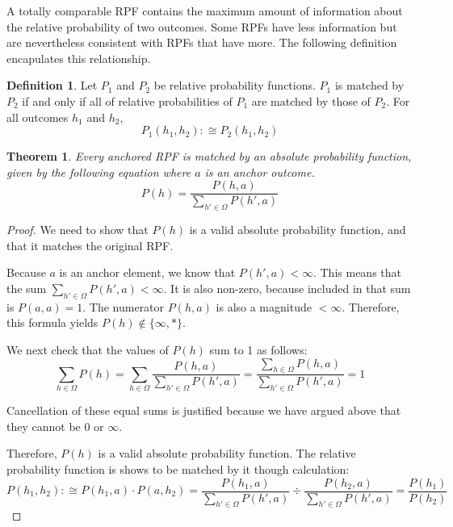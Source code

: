 \documentclass[twoside]{article}
\theoremstyle{plain}%
\newtheorem{theorem}{Theorem}[section]
\theoremstyle{definition}
\newtheorem{definition}{Definition}[section]
\theoremstyle{remark}
\begin{document}
A totally comparable RPF contains the maximum amount of information about the relative probability of two outcomes. Some RPFs have less information but are nevertheless consistent with RPFs that have more. The following definition encapulates this relationship.

\begin{definition}
Let \(P_1\) and \(P_2\) be relative probability functions. \(P_1\) is matched by \(P_2\) if and only if all of relative probabilities of \(P_1\) are matched by those of \(P_2\). For all outcomes \(h_1\) and \(h_2\),
\[P_1(h_1, h_2) :\cong P_2(h_1, h_2)\]
\end{definition}

\begin{theorem}
\label{thm:absolute_prob_formula}
Every anchored RPF is matched by an absolute probability function, given by the following equation where \(a\) is an anchor outcome.
\[P(h) = \frac{P(h, a)}{\sum_{h' \in \Omega}P(h', a)}\]
\end{theorem}

\begin{proof}
We need to show that \(P(h)\) is a valid absolute probability function, and that it matches the original RPF.

Because \(a\) is an anchor element, we know that \(P(h', a) < \infty\). This means that the sum \(\sum_{h' \in \Omega}P(h', a) < \infty\). It is also non-zero, because included in that sum is \(P(a, a) = 1\). The numerator \(P(h, a)\) is also a magnitude \(< \infty\). Therefore, this formula yields \(P(h) \notin \{\infty, \ast\}\).

We next check that the values of \(P(h)\) sum to 1 as follows:
\[\sum_{h \in \Omega}P(h) = \sum_{h \in \Omega} \frac{P(h, a)}{\sum_{h' \in \Omega}P(h', a)} = \frac{\sum_{h \in \Omega}P(h, a)}{\sum_{h' \in \Omega}P(h', a)} = 1\]

Cancellation of these equal sums is justified because we have argued above that they cannot be \(0\) or \(\infty\).

Therefore, \(P(h)\) is a valid absolute probability function. The relative probability function is shows to be matched by it though calculation:
\begin{equation}
P(h_1, h_2) :\cong P(h_1, a) \cdot P(a, h_2) = \frac{P(h_1, a)}{\sum_{h' \in \Omega}P(h', a)} \div \frac{P(h_2, a)}{\sum_{h' \in \Omega}P(h', a)} = \frac{P(h_1)}{P(h_2)}
\end{equation}
\end{proof}
\end{document}
